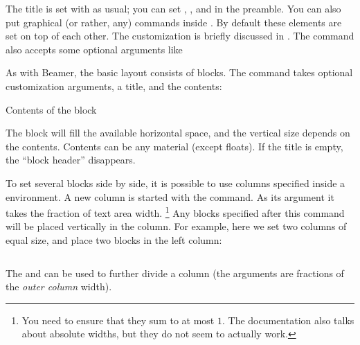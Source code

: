 The title is set with  as usual;
you can set , , and  in the preamble.
You can also put graphical (or rather, any) commands inside .
By default these elements are set on top of each other.
The customization is briefly discussed in .
The  command also accepts some optional arguments like
%
\begin{ExampleCode}
\maketitle[width=40cm]
\end{ExampleCode}



As with Beamer, the basic layout consists of blocks.
The  command takes optional customization arguments,
a title, and the contents:
%
\begin{ExampleCode}
{
Contents of the block
}
\end{ExampleCode}
%
The block will fill the available horizontal space,
and the vertical size depends on the contents.
Contents can be any material (except floats).
If the title is empty, the ``block header'' disappears.

To set several blocks side by side, it is possible to use columns
specified inside a  environment.
A new column is started with the  command.
As its argument it takes the fraction of text area width.%
\footnote{You need to ensure that they sum to at most $1$.
The documentation also talks about absolute widths, but they do not seem to actually work.}
Any blocks specified after this command will be placed vertically in the column.
For example, here we set two columns of equal size,
and place two blocks in the left column:
%
\begin{ExampleCode}
\begin{columns}



\end{columns}
\end{ExampleCode}

The  and 
can be used to further divide a column
(the arguments are fractions of the \emph{outer column} width).

